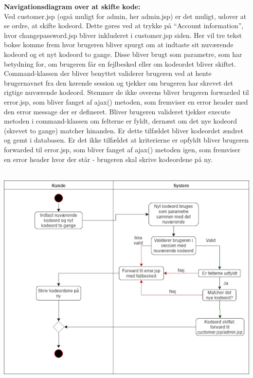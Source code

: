 \documentclass[11pt]{report}
\begin{document}
\noindent
\textbf{Navigationsdiagram over at skifte kode:}\\
Ved customer.jsp (også muligt for admin, her admin.jsp) er det muligt, udover at se ordre, at skifte kodeord. Dette gøres ved at trykke på “Account information”, hvor changepassword.jsp bliver inkluderet i customer.jsp siden. Her vil tre tekst bokse komme frem hvor brugeren bliver spurgt om at indtaste sit nuværende kodeord og et nyt kodeord to gange. Disse bliver brugt som parametre, som har betydning for, om brugeren får en fejlbesked eller om kodeordet bliver skiftet. Command-klassen der bliver benyttet validerer brugeren ved at hente brugernavnet fra den kørende session og tjekker om brugeren har skrevet det rigtige nuværende kodeord. Stemmer de ikke overens bliver brugeren forwarded til error.jsp, som bliver fanget af ajax() metoden, som fremviser en error header med den error message der er defineret. Bliver brugeren valideret tjekker execute metoden i command-klassen om felterne er fyldt, dernæst om det nye kodeord (skrevet to gange) matcher hinanden. Er dette tilfældet bliver kodeordet ændret og gemt i databasen. Er det ikke tilfældet at kriterierne er opfyldt bliver brugeren forwarded til error.jsp, som bliver fanget af ajax() metoden igen, som fremviser en error header hvor der står - brugeren skal skrive kodeordene på ny.\\\\
\begin{center}
\includegraphics[width=15cm]{ChangePasswordCupCake.png}
\end{center}
\newpage
\end{document}
